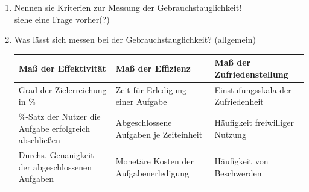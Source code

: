 \begin{enumerate}
	\item Nennen sie Kriterien zur Messung der Gebrauchstauglichkeit!\\
	siehe eine Frage vorher(?)
	
	\newpage
	\item Was lässt sich messen bei der Gebrauchstauglichkeit? (allgemein)
	\begin{table}[!h]
		\centering
		\begin{tabular}{|p{13em}|p{13em}|p{13em}|}
			\hline
			\textbf{Maß der Effektivität} & \textbf{Maß der Effizienz} & \textbf{Maß der Zufriedenstellung}\\
			\hline
			Grad der Zielerreichung in \% & Zeit für Erledigung einer Aufgabe & Einstufungsskala der Zufriedenheit\\
			\hline
			\%-Satz der Nutzer die Aufgabe erfolgreich abschließen & Abgeschlossene Aufgaben je Zeiteinheit & Häufigkeit freiwilliger Nutzung\\
			\hline
			Durchs. Genauigkeit der abgeschlossenen Aufgaben & Monetäre Kosten der Aufgabenerledigung & Häufigkeit von Beschwerden\\
			\hline
		\end{tabular}
	\end{table}
	

\end{enumerate}
